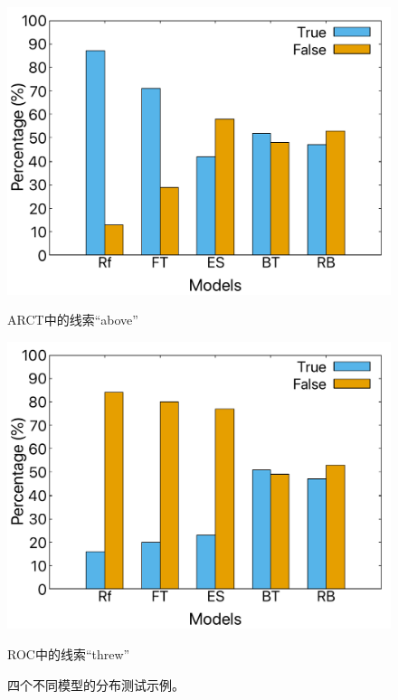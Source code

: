 \begin{figure}[th]
    \vspace{0.5cm}
    
    \begin{minipage}[b]{0.45\linewidth}
    \centering
    \includegraphics[width=\columnwidth]{figures/emnlp/above-arct.pdf}
    \caption*{ARCT中的线索``above''} 
    \label{fig4:cue_above} 
    \end{minipage}
    \hspace{0.5cm} 
    \begin{minipage}[b]{0.45\linewidth} 
    \centering 
    \includegraphics[width=\columnwidth]{figures/emnlp/threw-roc.pdf} 
    \caption*{ROC中的线索``threw''}
    \label{fig4:cue_threw}
    \end{minipage}
    \caption{四个不同模型的分布测试示例。}
    \label{fig4:cue_result}
    \end{figure}

